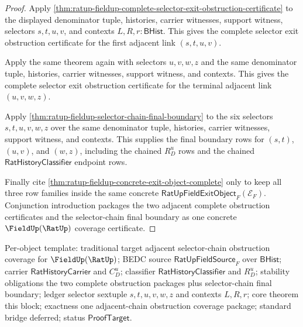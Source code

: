 \begin{proof}
Apply
\autoref{thm:ratup-fieldup-complete-selector-exit-obstruction-certificate} to the
displayed denominator tuple, histories, carrier witnesses, support witness,
selectors $s,t,u,v$, and contexts $L,R,r:\mathsf{BHist}$. This gives the complete
selector exit obstruction certificate for the first adjacent link
$(s,t,u,v)$.

Apply the same theorem again with selectors $u,v,w,z$ and the same denominator
tuple, histories, carrier witnesses, support witness, and contexts. This gives
the complete selector exit obstruction certificate for the terminal adjacent link
$(u,v,w,z)$.

Apply \autoref{thm:ratup-fieldup-selector-chain-final-boundary} to the six
selectors $s,t,u,v,w,z$ over the same denominator tuple, histories, carrier
witnesses, support witness, and contexts. This supplies the final boundary rows
for $(s,t)$, $(u,v)$, and $(w,z)$, including the chained $R_D^u$ rows and the
chained $\mathsf{RatHistoryClassifier}$ endpoint rows.

Finally cite \autoref{thm:ratup-fieldup-concrete-exit-object-complete} only to
keep all three row families inside the same concrete
$\mathsf{RatUpFieldExitObject}_F(\mathcal E_F)$. Conjunction introduction
packages the two adjacent complete obstruction certificates and the
selector-chain final boundary as one concrete $\FieldUp(\RatUp)$ coverage
certificate.
\end{proof}

Per-object template: traditional target adjacent selector-chain obstruction
coverage for $\FieldUp(\RatUp)$; BEDC source $\mathsf{RatUpFieldSource}_F$ over
$\mathsf{BHist}$; carrier $\mathsf{RatHistoryCarrier}$ and $C_D^u$; classifier
$\mathsf{RatHistoryClassifier}$ and $R_D^u$; stability obligations the two
complete obstruction packages plus selector-chain final boundary; ledger selector
sextuple $s,t,u,v,w,z$ and contexts $L,R,r$; core theorem this block; exactness
one adjacent-chain obstruction coverage package; standard bridge deferred; status
$\mathsf{ProofTarget}$.
